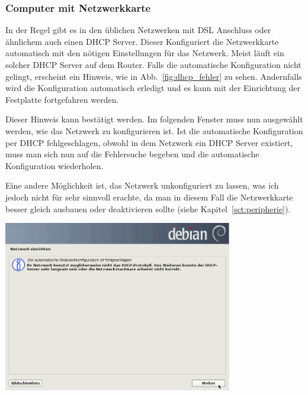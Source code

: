 \documentclass[a4paper,12pt,twoside]{article}
\begin{document}
\subsubsection{Computer mit Netzwerkkarte}
\label{sct:inst_mit_netzwerk}
In der Regel gibt es in den üblichen Netzwerken mit DSL Anschluss oder
ähnlichem auch einen DHCP Server. Dieser Konfiguriert die Netzwerkkarte
automatisch mit den nötigen Einstellungen für das Netzwerk. Meist läuft
ein solcher DHCP Server auf dem Router. Falls die automatische
Konfiguration nicht gelingt, erscheint ein Hinweis, wie in
Abb.~\ref{fig:dhcp_fehler} zu sehen. Andernfalls wird die Konfiguration
automatisch erledigt und es kann mit der Einrichtung der Festplatte
fortgefahren werden.

Dieser Hinweis kann bestätigt werden. Im folgenden Fenster muss nun
ausgewählt werden, wie das Netzwerk zu konfigurieren ist. Ist die
automatische Konfiguration per DHCP fehlgeschlagen, obwohl in dem
Netzwerk ein DHCP Server existiert, muss man sich nun auf die
Fehlersuche begeben und die automatische Konfiguration wiederholen.

Eine andere Möglichkeit ist, das Netzwerk unkonfiguriert zu lassen, was
ich jedoch nicht für sehr sinnvoll erachte, da man in diesem Fall die
Netzwerkkarte besser gleich ausbauen oder deaktivieren sollte (siehe
Kapitel~\ref{sct:peripherie}).

\bigskip
\begin{minipage}{\linewidth}
    \centering
    \includegraphics[width=10cm]{efaLivede-img/efaLivede-img7.png}
    \label{fig:dhcp_fehler}
\end{minipage}
\end{document}
